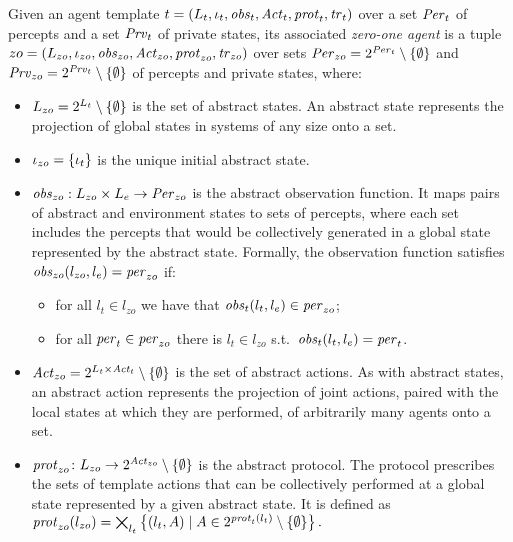 \begin{definition}
Given an agent template ${t} = \left ( L_{t}, \iota_{t}, \mathit{obs}_{t},  \mathit{Act}_{t},
\mathit{prot}_{t}, \mathit{tr}_{t}  \right )$ over a set $\mathit{Per}_{t}$ of percepts and a set $\mathit{Prv}_{t}$ of
private states, its associated \emph{zero-one agent} is a tuple ${zo} =
\left ( L_{zo}, \iota_{zo}, \mathit{obs}_{zo}, \mathit{Act}_{zo}, \mathit{prot}_{zo}, \mathit{tr}_{zo} \right )$ over
sets $\mathit{Per}_{zo} = 2^{\mathit{Per}_{t}} \setminus \left \{ \emptyset \right \}$ and $\mathit{Prv}_{zo}=
2^{\mathit{Prv}_{t}} \setminus \left \{ \emptyset \right \}$ of percepts and private states, where:
\begin{itemize}[$\bullet$]\itemsep 0cm
    \item $L_{zo} = 2^{L_{t}} \setminus \left \{ \emptyset \right \}$ is the set
    of abstract states. An abstract state represents the projection of global
    states in systems of any size onto a set.

    \item $\iota_{zo} = \left \{ \iota_{t} \right \}$ is the unique initial abstract state.
    
    \item $\mathit{obs}_{zo} : L_{zo} \times L_{e} \rightarrow \mathit{Per}_{zo}$ is
    the abstract observation function. It maps pairs of abstract and environment
    states to sets of percepts, where each set includes the percepts that would
    be collectively generated in a global state represented by the abstract
    state. Formally, the observation function satisfies $\mathit{obs}_{zo}(l_{zo}, l_e) =
    \mathit{per}_{zo}$ if:
    \begin{itemize}[\textbf{--}]
    \item for all $l_t \in l_{zo}$ we have that $\mathit{obs}_{t}(l_t, l_e) \in \mathit{per}_{zo}$;
      \item for all $\mathit{per}_{t} \in \mathit{per}_{zo}$ there is $l_t \in l_{zo}$ s.t.\
        $\mathit{obs}_{t}(l_t, l_e) = \mathit{per}_{t}$.
    \end{itemize}

    \item $\mathit{Act}_{zo} = 2^{L_{t} \times \mathit{Act}_{t}} \setminus \left \{ \emptyset \right \}$
    is the set of abstract actions. As with abstract states, an abstract
    action represents the projection of joint actions, paired with the local
    states at which they are performed, of arbitrarily many agents onto a set.

    \item $\mathit{prot}_{zo} \colon L_{zo} \rightarrow 2^{\mathit{Act}_{zo}} \setminus
    \left \{ \emptyset \right \}$ is the abstract protocol. The protocol prescribes the sets
    of template actions that can be collectively performed at a global state
    represented by a given abstract state. It is defined as $\mathit{prot}_{zo}(l_{zo})
        = \bigtimes_{l_t}  \left \{  (l_t, A) \mid A
        \in  2^{\mathit{prot}_{t}(l_t)} \setminus \left \{ \emptyset \right \} \right \}.$


\end{itemize}
\end{definition}
